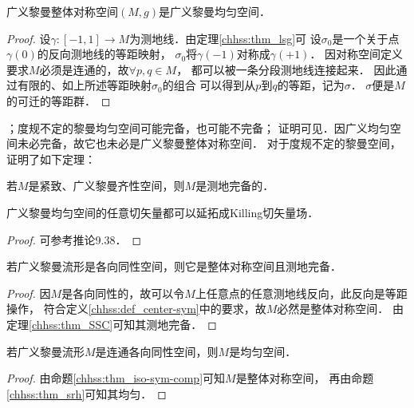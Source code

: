 \begin{proposition}\label{chhss:thm_srh}
    广义黎曼整体对称空间$(M,g)$是广义黎曼均匀空间．
\end{proposition}
\begin{proof}
    设$\gamma:[-1,1]\to M$为测地线．由定理\ref{chhss:thm_lsg}可
    设$\sigma_0$是一个关于点$\gamma(0)$的反向测地线的等距映射，
    $\sigma_0$将$\gamma(-1)$对称成$\gamma(+1)$．
    因对称空间定义要求$M$必须是连通的，故$\forall p,q \in M$，
    都可以被一条分段测地线连接起来．
    因此通过有限的、如上所述等距映射$\sigma_0$的组合
    可以得到从$p$到$q$的等距，记为$\sigma$．
    $\sigma$便是$M$的可迁的等距群．
\end{proof}


；度规不定的黎曼均匀空间可能完备，也可能不完备；
证明可见\parencite[9.37]{oneill1983}．因广义均匀空间未必完备，故它也未必是广义黎曼整体对称空间．
对于度规不定的黎曼空间，\textcite{marsden-1973}证明了如下定理：

\begin{theorem}\label{chhss:thm_marsden}
    若$M$是紧致、广义黎曼齐性空间，则$M$是测地完备的．    
\end{theorem}


\begin{proposition}\label{chhss:thm_h-killing}
    广义黎曼均匀空间的任意切矢量都可以延拓成Killing切矢量场．
\end{proposition}
\begin{proof}
    可参考\parencite{oneill1983}推论9.38．
\end{proof}


\begin{proposition}\label{chhss:thm_iso-sym-comp}
    若广义黎曼流形是各向同性空间，则它是整体对称空间且测地完备．
\end{proposition}
\begin{proof}
    因$M$是各向同性的，故可以令$M$上任意点的任意测地线反向，此反向是等距操作，
    符合定义\ref{chhss:def_center-sym}中的要求，故$M$必然是整体对称空间．
    由定理\ref{chhss:thm_SSC}可知其测地完备．
\end{proof}


\begin{proposition}\label{chhss:thm_iso2homo}
    若广义黎曼流形$M$是连通各向同性空间，则$M$是均匀空间．
\end{proposition}
\begin{proof}
    由命题\ref{chhss:thm_iso-sym-comp}可知$M$是整体对称空间，
    再由命题\ref{chhss:thm_srh}可知其均匀．
\end{proof}


